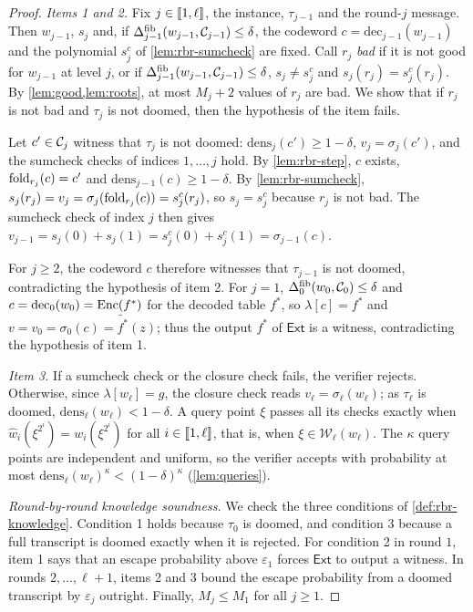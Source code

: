 \begin{proof}
\emph{Items 1 and 2.} Fix $j \in \llbracket 1, \ell \rrbracket$, the instance, $\tau_{j-1}$ and the round-$j$ message.
Then $w_{j-1}$, $s_j$ and, if $\Delta^{\mathrm{fib}}_{j-1}(w_{j-1},\mathcal{C}_{j-1}) \le \delta$, the codeword $c = \mathrm{dec}_{j-1}(w_{j-1})$ and the polynomial $s^{c}_j$ of \cref{lem:rbr-sumcheck} are fixed.
Call $r_j$ \emph{bad} if it is not good for $w_{j-1}$ at level $j$, or if $\Delta^{\mathrm{fib}}_{j-1}(w_{j-1},\mathcal{C}_{j-1}) \le \delta$, $s_j \ne s^{c}_j$ and $s_j(r_j) = s^{c}_j(r_j)$.
By \cref{lem:good,lem:roots}, at most $M_j + 2$ values of $r_j$ are bad.
We show that if $r_j$ is not bad and $\tau_j$ is not doomed, then the hypothesis of the item fails.

Let $c' \in \mathcal{C}_j$ witness that $\tau_j$ is not doomed: $\mathrm{dens}_j(c') \ge 1-\delta$, $v_j = \sigma_j(c')$, and the sumcheck checks of indices $1,\dots,j$ hold.
By \cref{lem:rbr-step}, $c$ exists, $\mathrm{fold}_{r_j}(c) = c'$ and $\mathrm{dens}_{j-1}(c) \ge 1-\delta$.
By \cref{lem:rbr-sumcheck}, $s_j(r_j) = v_j = \sigma_j(\mathrm{fold}_{r_j}(c)) = s^{c}_j(r_j)$, so $s_j = s^{c}_j$ because $r_j$ is not bad.
The sumcheck check of index $j$ then gives $v_{j-1} = s_j(0) + s_j(1) = s^{c}_j(0) + s^{c}_j(1) = \sigma_{j-1}(c)$.

For $j \ge 2$, the codeword $c$ therefore witnesses that $\tau_{j-1}$ is not doomed, contradicting the hypothesis of item 2.
For $j = 1$, $\Delta^{\mathrm{fib}}_0(w_0,\mathcal{C}_0) \le \delta$ and $c = \mathrm{dec}_0(w_0) = \mathrm{Enc}(f^*)$ for the decoded table $f^*$, so $\lambda[c] = f^*$ and $v = v_0 = \sigma_0(c) = \tilde{f^*}(z)$; thus the output $f^*$ of $\mathsf{Ext}$ is a witness, contradicting the hypothesis of item 1.

\emph{Item 3.} If a sumcheck check or the closure check fails, the verifier rejects. Otherwise, since $\lambda[w_\ell] = g$, the closure check reads $v_\ell = \sigma_\ell(w_\ell)$; as $\tau_\ell$ is doomed, $\mathrm{dens}_\ell(w_\ell) < 1-\delta$.
A query point $\xi$ passes all its checks exactly when $\hat w_i(\xi^{2^i}) = w_i(\xi^{2^i})$ for all $i \in \llbracket 1, \ell \rrbracket$, that is, when $\xi \in \mathcal{W}_\ell(w_\ell)$.
The $\kappa$ query points are independent and uniform, so the verifier accepts with probability at most $\mathrm{dens}_\ell(w_\ell)^{\kappa} < (1-\delta)^{\kappa}$ (\cref{lem:queries}).

\emph{Round-by-round knowledge soundness.} We check the three conditions of \cref{def:rbr-knowledge}.
Condition 1 holds because $\tau_0$ is doomed, and condition 3 because a full transcript is doomed exactly when it is rejected.
For condition 2 in round $1$, item 1 says that an escape probability above $\varepsilon_1$ forces $\mathsf{Ext}$ to output a witness.
In rounds $2,\dots,\ell+1$, items 2 and 3 bound the escape probability from a doomed transcript by $\varepsilon_j$ outright.
Finally, $M_j \le M_1$ for all $j \ge 1$.
\end{proof}

